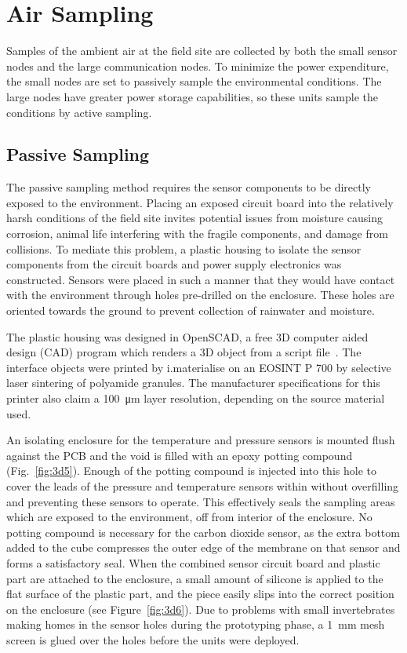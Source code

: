\documentclass[numbook, envcountsect, envcountsame, envcountreset, runningheads, twocolumn]{svjour3}
\begin{document}
	\section{Air Sampling}
	
		Samples of the ambient air at the field site are collected by both the small sensor nodes and the large communication nodes.  To minimize the power expenditure, the small nodes are set to passively sample the environmental conditions.  The large nodes have greater power storage capabilities, so these units sample the conditions by active sampling.  
		
		\subsection{Passive Sampling}
			The passive sampling method requires the sensor components to be directly exposed to the environment.  Placing an exposed circuit board into the relatively harsh conditions of the field site invites potential issues from moisture causing corrosion, animal life interfering with the fragile components, and damage from collisions.  To mediate this problem, a plastic housing to isolate the sensor components from the circuit boards and power supply electronics was constructed.  Sensors were placed in such a manner that they would have contact with the environment through holes pre-drilled on the enclosure.  These holes are oriented towards the ground to prevent collection of rainwater and moisture.  
			
			The plastic housing was designed in OpenSCAD, a free 3D computer aided design (CAD) program which renders a 3D object from a script file~\cite{kintel_openscad_2011}.  The interface objects were printed by i.materialise on an EOSINT P 700 by selective laser sintering of polyamide granules.  The manufacturer specifications for this printer also claim a \SI{100}{\micro\meter} layer resolution, depending on the source material used. 
			
			An isolating enclosure for the temperature and pressure sensors is mounted flush against the PCB and the void is filled with an epoxy potting compound (Fig.~\ref{fig:3d5}).  Enough of the potting compound is injected into this hole to cover the leads of the pressure and temperature sensors within without overfilling and preventing these sensors to operate.  This effectively seals the sampling areas which are exposed to the environment, off from interior of the enclosure.  No potting compound is necessary for the carbon dioxide sensor, as the extra bottom added to the cube compresses the outer edge of the membrane on that sensor and forms a satisfactory seal.  When the combined sensor circuit board and plastic part are attached to the enclosure, a small amount of silicone is applied to the flat surface of the plastic part, and the piece easily slips into the correct position on the enclosure (see Figure~\ref{fig:3d6}).  Due to problems with small invertebrates making homes in the sensor holes during the prototyping phase, a \SI{1}{\milli\meter} mesh screen is glued over the holes before the units were deployed.
			
\end{document}
